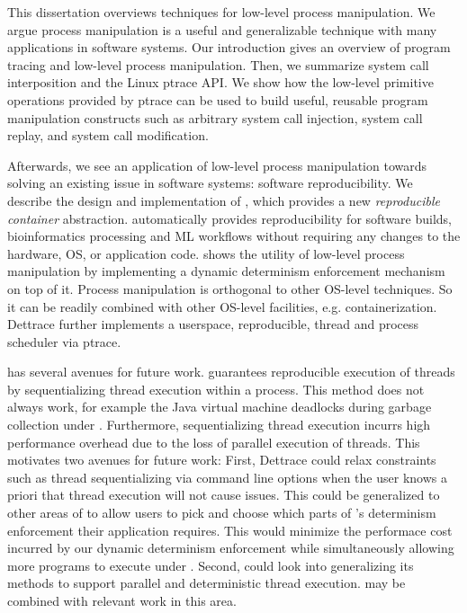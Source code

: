 This dissertation overviews techniques for low-level process manipulation. We argue process manipulation is a useful and generalizable technique with many applications in software systems. Our introduction gives an overview of program tracing and low-level process manipulation. Then, we summarize system call interposition and the Linux ptrace API. We show how the low-level primitive operations provided by ptrace can be used to build useful, reusable program manipulation constructs such as arbitrary system call injection, system call replay, and system call modification. 

Afterwards, we see an application of low-level process manipulation towards solving an existing issue in software systems: software reproducibility. We describe the design and implementation of \dettrace, which provides a new \emph{reproducible container} abstraction. \dettrace automatically provides reproducibility for software builds, bioinformatics processing and ML workflows without requiring any changes to the hardware, OS, or application code. \dettrace{} shows the utility of low-level process manipulation by implementing a dynamic determinism enforcement mechanism on top of it. Process manipulation is orthogonal to other OS-level techniques. So it can be readily combined with other OS-level facilities, e.g. containerization. Dettrace further implements a userspace, reproducible, thread and process scheduler via ptrace.

\dettrace has several avenues for future work. \dettrace guarantees reproducible execution of threads by sequentializing thread execution within   a process. This method does not always work, for example the Java virtual machine deadlocks during garbage collection under \dettrace. Furthermore, sequentializing thread execution incurrs high performance overhead due to the loss of parallel execution of threads. This motivates two avenues for future work: First, Dettrace could relax constraints such as thread sequentializing via command line options when the user knows a priori that thread execution will not cause issues. This could be generalized to other areas of \dettrace{} to allow users to pick and choose which parts of \dettrace{}'s determinism enforcement their application requires. This would minimize the performace cost incurred by our dynamic determinism enforcement while simultaneously allowing more programs to execute under \dettrace{}. Second, \dettrace{} could look into generalizing its methods to support parallel and deterministic thread execution. \dettrace may be combined with relevant work in this area.

